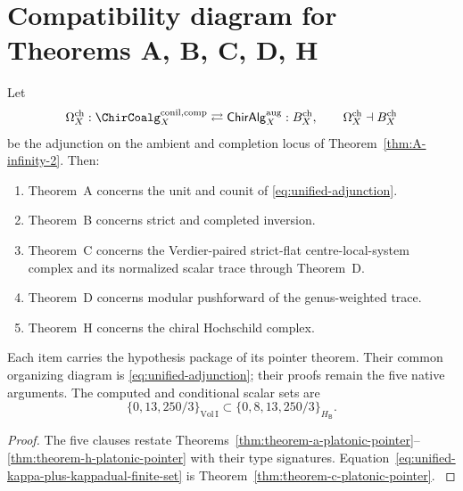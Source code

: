 \section{Compatibility diagram for Theorems A, B, C, D, H}
\label{sec:climax-unified-five-theorem-identity}
\label{ssec:climax-unified-grand-synthesis}

\begin{theorem}
\label{thm:unified-five-theorem-identity}
\ClaimStatusConditional
Let
\begin{equation}
\label{eq:unified-adjunction}
 \Omega_X^{\mathrm{ch}}
 :
 \ChirCoalg_X^{\mathrm{conil,comp}}
 \rightleftarrows
 \ChirAlg_X^{\mathrm{aug}}
 :
 B_X^{\mathrm{ch}},
 \qquad
 \Omega_X^{\mathrm{ch}}\dashv B_X^{\mathrm{ch}}
\end{equation}
be the adjunction on the ambient and completion locus of
Theorem~\ref{thm:A-infinity-2}.  Then:
\begin{enumerate}[label=\textup{(\Roman*)}]
\item Theorem~A concerns the unit and counit of
\eqref{eq:unified-adjunction}.
\item Theorem~B concerns strict and completed inversion.
\item Theorem~C concerns the Verdier-paired strict-flat
centre-local-system complex and its normalized scalar trace through
Theorem~D.
\item Theorem~D concerns modular pushforward of the genus-weighted
trace.
\item Theorem~H concerns the chiral Hochschild complex.
\end{enumerate}
Each item carries the hypothesis package of its pointer theorem.
Their common organizing diagram is
\eqref{eq:unified-adjunction}; their proofs remain the five native
arguments.
The computed and conditional scalar sets are
\begin{equation}
\label{eq:unified-kappa-plus-kappadual-finite-set}
 \{0,13,250/3\}_{\mathrm{Vol\,I}}
 \subset
 \{0,8,13,250/3\}_{H_{\mathsf B}}.
\end{equation}
\end{theorem}

\begin{proof}
The five clauses restate
Theorems~\ref{thm:theorem-a-platonic-pointer}--%
\ref{thm:theorem-h-platonic-pointer} with their type signatures.
Equation~\eqref{eq:unified-kappa-plus-kappadual-finite-set} is
Theorem~\ref{thm:theorem-c-platonic-pointer}.
\label{prf:unified-five-theorem-identity}
\end{proof}

